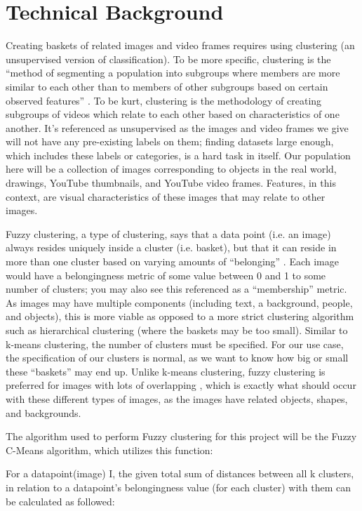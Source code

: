\documentclass[10pt,twocolumn]{article}
\begin{document}
\section{Technical Background} 

Creating baskets of related images and video frames requires using clustering (an unsupervised version of classification). To be more specific, clustering is the “method of segmenting a population into subgroups where members are more similar to each other than to members of other subgroups based on certain observed features” \cite{C3Clustering}. To be kurt, clustering is the methodology of creating subgroups of videos which relate to each other based on characteristics of one another. It’s referenced as unsupervised as the images and video frames we give will not have any pre-existing labels on them; finding datasets large enough, which includes these labels or categories, is a hard task in itself. Our population here will be a collection of images corresponding to objects in the real world, drawings, YouTube thumbnails, and YouTube video frames. Features, in this context, are visual characteristics of these images that may relate to other images.

Fuzzy clustering, a type of clustering, says that a data point (i.e. an image) always resides uniquely inside a cluster (i.e. basket), but that it can reside in more than one cluster based on varying amounts of “belonging” \cite{PrasadClustering}. Each image would have a belongingness metric of some value between 0 and 1 to some number of clusters; you may also see this referenced as a “membership” metric. As images may have multiple components (including text, a background, people, and objects), this is more viable as opposed to a more strict clustering algorithm such as hierarchical clustering (where the baskets may be too small). Similar to k-means clustering, the number of clusters must be specified. For our use case, the specification of our clusters is normal, as we want to know how big or small these “baskets” may end up. Unlike k-means clustering, fuzzy clustering is preferred for images with lots of overlapping \cite{PrasadClustering}, which is exactly what should occur with these different types of images, as the images have related objects, shapes, and backgrounds.

The algorithm used to perform Fuzzy clustering for this project will be the Fuzzy C-Means algorithm, which utilizes this function:

For a datapoint(image) I, the given total sum of distances between all k clusters, in relation to a datapoint's belongingness value (for each cluster) with them
can be calculated as followed:
\end{document}
